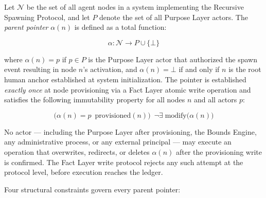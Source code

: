 \begin{dfn}
\label{dfn:parent-pointer}
Let $\mathcal{N}$ be the set of all agent nodes in a \bxthree{} system implementing the Recursive Spawning Protocol, and let $P$ denote the set of all Purpose Layer actors. The \emph{parent pointer} $\alpha(n)$ is defined as a total function:

\begin{equation}
\alpha : \mathcal{N} \longrightarrow P \cup \{\bot\}
\label{eq:parent-pointer-function}
\end{equation}

where $\alpha(n) = p$ if $p \in P$ is the Purpose Layer actor that authorized the spawn event resulting in node $n$'s activation, and $\alpha(n) = \bot$ if and only if $n$ is the root human anchor established at system initialization. The pointer is established \emph{exactly once} at node provisioning via a Fact Layer atomic write operation and satisfies the following immutability property for all nodes $n$ and all actors $p$:

\begin{equation}
\bigl(\alpha(n) = p \;\ \text{provisioned}(n)\bigr) \;\ \neg\exists\; \text{modify}\bigl(\alpha(n)\bigr)
\label{eq:parent-pointer-immutability}
\end{equation}

No actor --- including the Purpose Layer after provisioning, the Bounds Engine, any administrative process, or any external principal --- may execute an operation that overwrites, redirects, or deletes $\alpha(n)$ after the provisioning write is confirmed. The Fact Layer write protocol rejects any such attempt at the protocol level, before execution reaches the ledger.
\end{dfn}

Four structural constraints govern every parent pointer:


